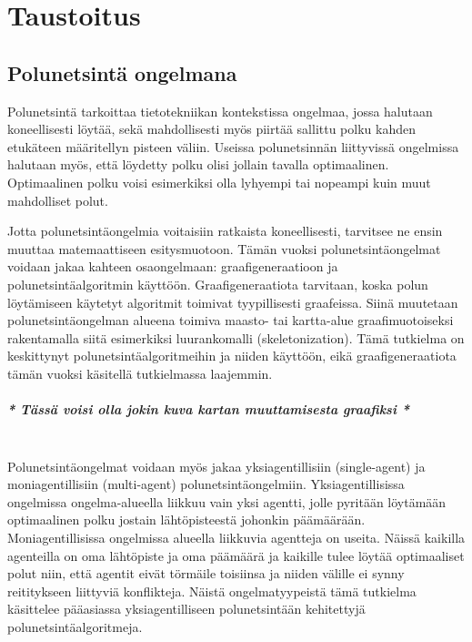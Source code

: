 \chapter{Taustoitus} \label{Taustoitus}

\section{Polunetsintä ongelmana}\label{pOngelmana}
Polunetsintä tarkoittaa tietotekniikan kontekstissa ongelmaa, jossa halutaan 
koneellisesti löytää, sekä mahdollisesti myös piirtää sallittu polku kahden 
etukäteen määritellyn pisteen väliin. Useissa polunetsinnän liittyvissä 
ongelmissa halutaan myös, että löydetty polku olisi jollain tavalla 
optimaalinen. Optimaalinen polku voisi esimerkiksi olla lyhyempi tai nopeampi 
kuin muut mahdolliset polut. \cite{MathewAndMalathy} \par
	Jotta polunetsintäongelmia voitaisiin ratkaista koneellisesti, 
tarvitsee ne ensin muuttaa matemaattiseen esitysmuotoon. Tämän vuoksi 
polunetsintäongelmat voidaan jakaa kahteen osaongelmaan: graafigeneraatioon 
ja polunetsintäalgoritmin käyttöön. Graafigeneraatiota tarvitaan, koska polun 
löytämiseen käytetyt algoritmit toimivat tyypillisesti graafeissa. Siinä 
muutetaan polunetsintäongelman alueena toimiva maasto- tai kartta-alue 
graafimuotoiseksi rakentamalla siitä esimerkiksi luurankomalli 
(skeletonization). \cite{ACMHindawi} Tämä tutkielma on keskittynyt 
polunetsintäalgoritmeihin ja niiden käyttöön, eikä graafigeneraatiota tämän 
vuoksi käsitellä tutkielmassa laajemmin.
\\
\paragraph{\textit{* Tässä voisi olla jokin kuva kartan muuttamisesta graafiksi *}}\mbox{}
\\
	Polunetsintäongelmat voidaan myös jakaa yksiagentillisiin 
(single-agent) ja moniagentillisiin (multi-agent) polunetsintäongelmiin. 
Yksiagentillisissa ongelmissa ongelma-alueella liikkuu vain yksi agentti, 
jolle pyritään löytämään optimaalinen polku jostain lähtöpisteestä johonkin 
päämäärään. Moniagentillisissa ongelmissa alueella liikkuvia agentteja on 
useita. Näissä kaikilla agenteilla on oma lähtöpiste ja oma päämäärä ja 
kaikille tulee löytää optimaaliset polut niin, että agentit eivät törmäile 
toisiinsa ja niiden välille ei synny reititykseen liittyviä konflikteja. 
\cite{arXivMAPF} Näistä ongelmatyypeistä tämä tutkielma käsittelee 
pääasiassa yksiagentilliseen polunetsintään kehitettyjä 
polunetsintäalgoritmeja.

